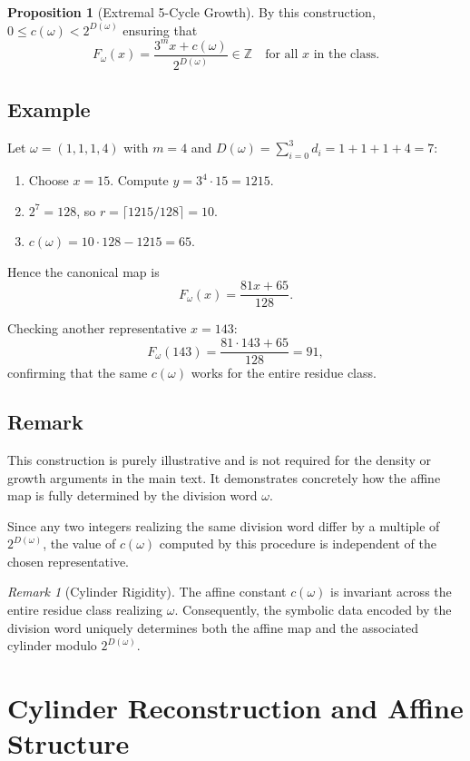 \documentclass[12pt, oneside]{article}
\numberwithin{equation}{section}
\theoremstyle{definition}
\newtheorem{proposition}{Proposition}[section]
\theoremstyle{plain}
\theoremstyle{remark}
\newtheorem*{remark}{Remark}
\begin{document}
\begin{proposition}[Extremal 5-Cycle Growth]
By this construction, \(0 \le c(\omega) < 2^{D(\omega)}\) ensuring that
\[
F_\omega(x) = \frac{3^m x + c(\omega)}{2^{D(\omega)}} \in \mathbb{Z} \quad \text{for all } x \text{ in the class.}
\]

\newpage
\subsection{Example}

Let \(\omega = (1,1,1,4)\) with \(m=4\) and \(D(\omega) = \sum_{i=0}^{3} d_i = 1 + 1 + 1 + 4 = 7\):

\begin{enumerate}
\item Choose \(x = 15\). Compute \(y = 3^4 \cdot 15 = 1215\).  
\item \(2^7 = 128\), so \(r = \lceil 1215/128 \rceil = 10\).  
\item \(c(\omega) = 10 \cdot 128 - 1215 = 65\).  
\end{enumerate}

Hence the canonical map is
\[
F_\omega(x) = \frac{81x + 65}{128}.
\]

Checking another representative \(x = 143\):
\[
F_\omega(143) = \frac{81 \cdot 143 + 65}{128} = 91,
\]
confirming that the same \(c(\omega)\) works for the entire residue class.

\subsection*{Remark}

This construction is purely illustrative and is not required for the density
or growth arguments in the main text. It demonstrates concretely how the affine
map is fully determined by the division word \(\omega\).

Since any two integers realizing the same division word differ by a multiple of $2^{D(\omega)}$,
the value of $c(\omega)$ computed by this procedure is independent of the chosen
representative.

\begin{remark}[Cylinder Rigidity]
The affine constant \(c(\omega)\) is invariant across the entire residue
class realizing \(\omega\).  Consequently, the symbolic data encoded by
the division word uniquely determines both the affine map and the associated
cylinder modulo \(2^{D(\omega)}\).
\end{remark}


\newpage
\section{Cylinder Reconstruction and Affine Structure}
\label{app:cylinder-reconstruction}


\end{proposition}
\end{document}
